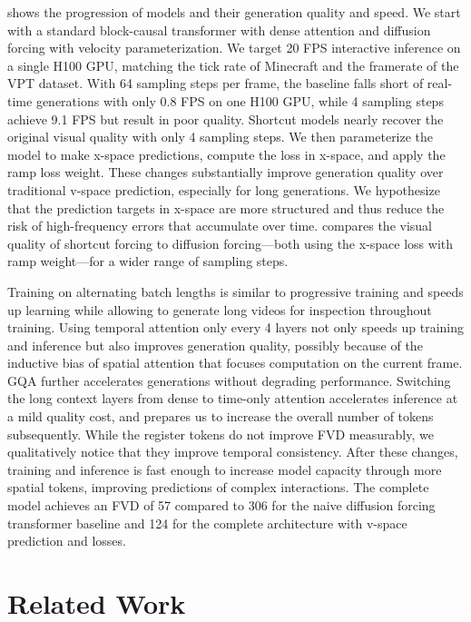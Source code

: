 \documentclass[11pt]{article}
\begin{document}
\pagebreak
%
 shows the progression of models and their generation quality and speed.
We start with a standard block-causal transformer with dense attention and diffusion forcing with velocity parameterization.
We target 20 FPS interactive inference on a single H100 GPU, matching the tick rate of Minecraft and the framerate of the VPT dataset.
With 64 sampling steps per frame, the baseline falls short of real-time generations with only 0.8 FPS on one H100 GPU, while 4 sampling steps achieve 9.1 FPS but result in poor quality.
Shortcut models \citep{shortcut} nearly recover the original visual quality with only 4 sampling steps.
We then parameterize the model to make x-space predictions, compute the loss in x-space, and apply the ramp loss weight.
These changes substantially improve generation quality over traditional v-space prediction, especially for long generations.
We hypothesize that the prediction targets in x-space are more structured and thus reduce the risk of high-frequency errors that accumulate over time.
 compares the visual quality of shortcut forcing to diffusion forcing---both using the x-space loss with ramp weight---for a wider range of sampling steps.

Training on alternating batch lengths is similar to progressive training and speeds up learning while allowing to generate long videos for inspection throughout training.
Using temporal attention only every 4 layers not only speeds up training and inference \citep{llama4} but also improves generation quality, possibly because of the inductive bias of spatial attention that focuses computation on the current frame.
GQA further accelerates generations without degrading performance.
Switching the long context layers from dense to time-only attention accelerates inference at a mild quality cost, and prepares us to increase the overall number of tokens subsequently.
While the register tokens do not improve FVD measurably, we qualitatively notice that they improve temporal consistency.
After these changes, training and inference is fast enough to increase model capacity through more spatial tokens, improving predictions of complex interactions.
The complete model achieves an FVD of 57 compared to 306 for the naive diffusion forcing transformer baseline and 124 for the complete architecture with v-space prediction and losses.



\pagebreak
\section{Related Work}
\end{document}
